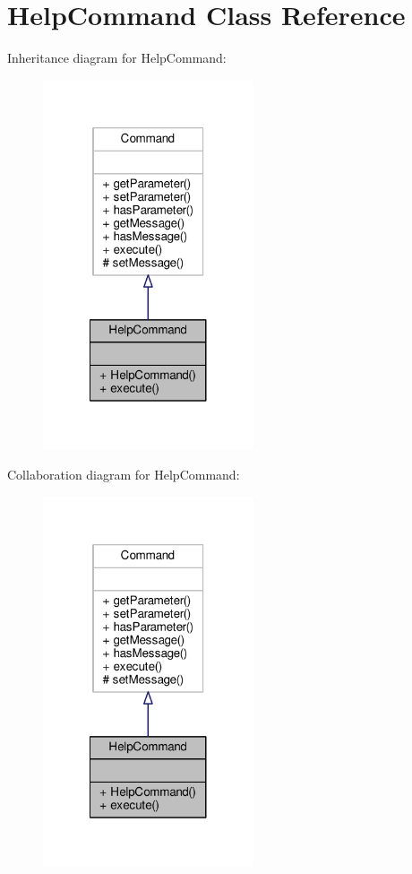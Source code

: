 \hypertarget{classHelpCommand}{\section{Help\-Command Class Reference}
\label{classHelpCommand}
}


Inheritance diagram for Help\-Command\-:
\nopagebreak
\begin{figure}[H]
\begin{center}
\leavevmode
\includegraphics[width=176pt]{classHelpCommand__inherit__graph}
\end{center}
\end{figure}


Collaboration diagram for Help\-Command\-:
\nopagebreak
\begin{figure}[H]
\begin{center}
\leavevmode
\includegraphics[width=176pt]{classHelpCommand__coll__graph}
\end{center}
\end{figure}
